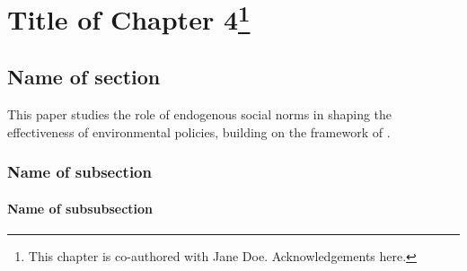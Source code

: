 \graphicspath{{5_chapter/figures/}}

\renewcommand*{\thefootnote}{\fnsymbol{footnote}}
\chapter[Title of Chapter 4]{Title of Chapter 4\footnote{\noindent
This chapter is co-authored with Jane Doe. Acknowledgements here.}}
\label{chapter:chapter4-alias}
\newpage

\setcounter{footnote}{0}
\renewcommand*{\thefootnote}{\arabic{footnote}}

\section{\label{}Name of section}

This paper studies the role of endogenous social norms in shaping the effectiveness of environmental policies, building on the framework of \citet{besley2023political}. \lipsum[1-2]



\lipsum[3-4]

\subsection{\label{}Name of subsection}

\lipsum[5-6]



\lipsum[7-8]

\subsubsection{\label{}Name of subsubsection}

\lipsum[9-10]

\newpage{}
\printbibliography[segment=0,heading=subbibintoc]

\newpage{}
\begin{subappendices}
\newrefsegment %

\end{subappendices}
